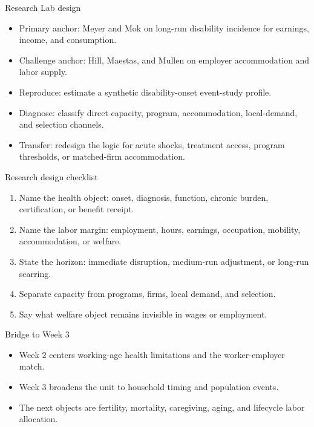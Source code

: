 \documentclass[aspectratio=169,11pt]{beamer}
\begin{document}
\begin{frame}{Research Lab design}
\begin{itemize}
    \item Primary anchor: Meyer and Mok on long-run disability incidence for earnings, income, and consumption.
    \item Challenge anchor: Hill, Maestas, and Mullen on employer accommodation and labor supply.
    \item Reproduce: estimate a synthetic disability-onset event-study profile.
    \item Diagnose: classify direct capacity, program, accommodation, local-demand, and selection channels.
    \item Transfer: redesign the logic for acute shocks, treatment access, program thresholds, or matched-firm accommodation.
\end{itemize}
\end{frame}

\begin{frame}{Research design checklist}
\begin{enumerate}
    \item Name the health object: onset, diagnosis, function, chronic burden, certification, or benefit receipt.
    \item Name the labor margin: employment, hours, earnings, occupation, mobility, accommodation, or welfare.
    \item State the horizon: immediate disruption, medium-run adjustment, or long-run scarring.
    \item Separate capacity from programs, firms, local demand, and selection.
    \item Say what welfare object remains invisible in wages or employment.
\end{enumerate}
\end{frame}

\begin{frame}{Bridge to Week 3}
\begin{itemize}
    \item Week 2 centers working-age health limitations and the worker-employer match.
    \item Week 3 broadens the unit to household timing and population events.
    \item The next objects are fertility, mortality, caregiving, aging, and lifecycle labor allocation.
\end{itemize}
\end{frame}
\end{document}
